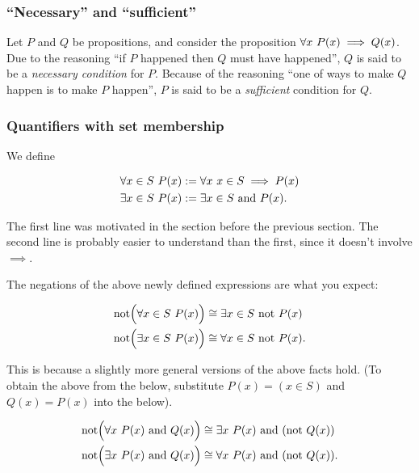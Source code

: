 \subsubsection{``Necessary'' and ``sufficient''}

Let $P$ and $Q$ be propositions, and consider the proposition $\forall x \text{ } P(x) \implies Q(x)$. Due to the reasoning ``if $P$ happened then $Q$ must have happened'', $Q$ is said to be a \textit{necessary condition} for $P$. Because of the reasoning ``one of ways to make $Q$ happen is to make $P$ happen'', $P$ is said to be a \textit{sufficient} condition for $Q$. 

\subsubsection{Quantifiers with set membership}

We define

\begin{align*}
    &\forall x \in S \text{ } P(x) := \forall x \text{ } x \in S \implies P(x) \\
    &\exists x \in S \text{ } P(x) := \exists x \in S \text{ and } P(x).
\end{align*}

The first line was motivated in the section before the previous section. The second line is probably easier to understand than the first, since it doesn't involve $\implies$.

The negations of the above newly defined expressions are what you expect:

\begin{align*}
    &\text{not}\Big( \forall x \in S \text{ } P(x) \Big) \cong \exists x \in S \text{ } \text{not } P(x) \\
    &\text{not}\Big( \exists x \in S \text{ } P(x) \Big) \cong \forall x \in S \text{ } \text{not } P(x).
\end{align*}

This is because a slightly more general versions of the above facts hold. (To obtain the above from the below, substitute $P(x) = (x \in S)$ and $Q(x) = P(x)$ into the below).

\begin{align*}
    &\text{not}\Big( \forall x \text{ } P(x) \text{ and } Q(x) \Big) \cong \exists x \text{ } P(x) \text{ and } (\text{not } Q(x)) \\
    &\text{not}\Big( \exists x \text{ } P(x) \text{ and } Q(x) \Big) \cong \forall x \text{ } P(x) \text{ and } (\text{not } Q(x)).
\end{align*}

